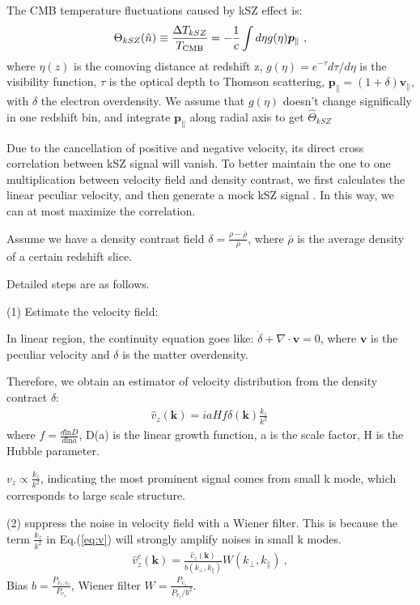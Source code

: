 The CMB temperature fluctuations caused by kSZ effect is:
\begin{eqnarray}
\label{eq:ksz}
\Theta_{kSZ}(\hat n)\equiv\frac{\Delta T_{kSZ}}{T_{\mathrm{CMB}}}
=-\frac{1}{c}\int d\eta  g(\eta)  \bm{p}_\parallel\ ,
\end{eqnarray}
where $\eta(z)$ is the comoving distance at redshift z, $g(\eta)=e^{-\tau} d\tau/d\eta$ is the visibility function, $\tau$ is the optical depth to Thomson scattering, $\bm{p}_\parallel=(1+\delta)\bm{v}_\parallel$, with $\delta$ the electron overdensity. 
We assume that $g(\eta)$ doesn't change significally in one redshift bin, 
and integrate $\bm{p}_\parallel$ along radial axis to get $\hat \Theta_{kSZ}$

Due to the cancellation of positive and negative velocity, its direct cross correlation between kSZ signal will vanish.
To better maintain the one to one multiplication between velocity field and density contrast, 
we first calculates the linear peculiar velocity, and then generate a mock kSZ signal 
\cite{Shao11}.
In this way, we can at most maximize the correlation.

Assume we have a density contrast field $\delta=\frac{\rho-\bar{\rho}}{\bar{\rho}}$, where $\bar\rho$ is the average density of a certain redshift slice. 

Detailed steps are as follows.

(1) Estimate the velocity field:

In linear region, the continuity equation goes like:
$\dot \delta+\nabla \cdot \bm{v}=0$, 
where $\bm{v}$ is the peculiar velocity and $\delta$ is the matter overdensity. 

Therefore, we obtain an estimator of velocity distribution from the density contract $\delta$:
\begin{eqnarray}
	\label{eq:v}
\hat v_z(\bm{k})=i a H f\delta(\bm{k})\frac{k_z}{k^2}\,
\end{eqnarray}
where $f=\frac{d\mathrm{ln}D}{d\mathrm{ln}a}$, D(a) is the linear growth function, 
a is the scale factor, H is the Hubble parameter.

$v_z \propto \frac{k_z}{k^2}$, indicating the most prominent signal comes from small k mode, which corresponds to large scale structure. 

(2) suppress the noise in velocity field with a Wiener filter. 
This is because the term $\frac{k_z}{k^2}$ in Eq.(\ref{eq:v}) will strongly amplify noises in small k modes. 
\begin{eqnarray}
	\label{eq:wienerv}
\hat v_z^c(\bm{k})=\frac{\hat v_z(\bm{k})}{b(k_\perp,k_\parallel)}W(k_\perp,k_\parallel)\ ,
\end{eqnarray}
Bias $b=\frac{P_{\hat v_z,v_z}}{P_{v_z}}$, Wiener filter $W=\frac{P_{v_z}}{P_{\hat v_z}/b^2}$.

